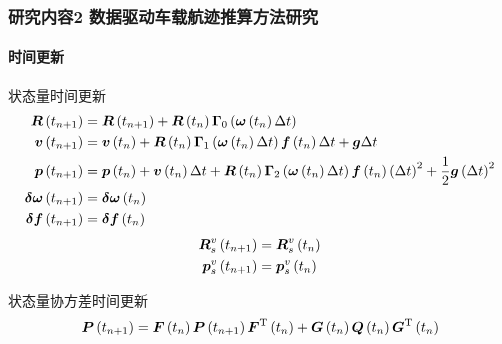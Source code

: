 \begin{frame}
	\frametitle{研究内容2 数据驱动车载航迹推算方法研究}	
	\framesubtitle{时间更新}
	\vspace{-0.4cm}
	\begin{block}{状态量时间更新}
	{
		\vspace{-0.4cm}
		{
			\scriptsize
			\begin{align*}
				\vb*{R}\left(t_{n+1}\right) &= \vb*{R}\left(t_{n+1}\right) + \vb*{R}\left(t_{n}\right) \vb*{\Gamma}_{0}\left( \vb*{\omega}\left(t_{n}\right) \Delta t \right) \\
				\vb*{v}\left(t_{n+1}\right) &= \vb*{v}\left(t_{n}\right) 
				+ \vb*{R}\left(t_{n}\right) \vb*{\Gamma}_{1}\left( \vb*{\omega}\left(t_{n}\right) \Delta t \right) \vb*{f}\left(t_{n}\right) \Delta t 
				+ \vb*{g}\Delta t \\
				\vb*{p}\left(t_{n+1}\right) &= \vb*{p}\left(t_{n}\right) 
				+ \vb*{v}\left(t_{n}\right) \Delta t
				+ \vb*{R}\left(t_{n}\right) \vb*{\Gamma}_{2}\left( \vb*{\omega}\left(t_{n}\right) \Delta t \right) \vb*{f}\left(t_{n}\right) \left(\Delta t\right)^2 
				+ \frac{1}{2}\vb*{g}\left(\Delta t\right)^2 \\
				\vb*{\delta \omega}\left(t_{n+1}\right) &= \vb*{\delta \omega}\left(t_{n}\right) \\
				\vb*{\delta f}\left(t_{n+1}\right) &= \vb*{\delta f}\left(t_{n}\right)
			\end{align*}
		}
		\vspace{-1.2cm}
		\begin{align*}
			\vb*{R}_s^v\left(t_{n+1}\right) &= \vb*{R}_s^v\left(t_{n}\right) \\
			\vb*{p}_s^v\left(t_{n+1}\right) &= \vb*{p}_s^v\left(t_{n}\right)  
		\end{align*}
	}
	\end{block}
	\begin{block}{状态量协方差时间更新}
	{
		\footnotesize 		
		\begin{equation*}
			\vb*{P}\left(t_{n+1}\right) = \vb*{F}\left(t_{n}\right) \vb*{P}\left(t_{n+1}\right) \vb*{F}^{\mathrm{T}}\left(t_{n}\right)
			+ \vb*{G}\left(t_{n}\right) \vb*{Q}\left(t_{n}\right) \vb*{G}^{\mathrm{T}}\left(t_{n}\right)
		\end{equation*}
	}
	\end{block} 
\end{frame}

